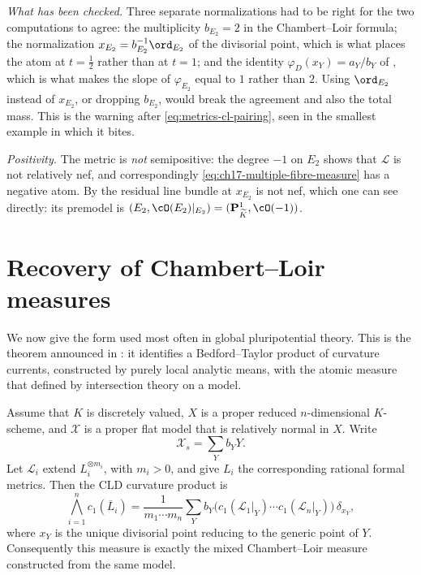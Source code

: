 \begin{example}
\emph{What has been checked.}  Three separate normalizations had to be right
for the two computations to agree: the multiplicity $b_{E_2}=2$ in the
Chambert--Loir formula; the normalization
$x_{E_2}=b_{E_2}^{-1}\ord_{E_2}$ of the divisorial point, which is what
places the atom at $t=\tfrac12$ rather than at $t=1$; and the identity
$\varphi_D(x_Y)=a_Y/b_Y$ of
, which is what makes the slope of
$\varphi_{E_2}$ equal to $1$ rather than $2$.  Using $\ord_{E_2}$
instead of $x_{E_2}$, or dropping $b_{E_2}$, would break the agreement
and also the total mass.  This is the warning after
\eqref{eq:metrics-cl-pairing}, seen in the smallest example in which it
bites.

\emph{Positivity.}  The metric is \emph{not} semipositive: the degree
$-1$ on $E_2$ shows that $\mathcal L$ is not relatively nef, and
correspondingly \eqref{eq:ch17-multiple-fibre-measure} has a negative atom.
By  the residual line bundle at
$x_{E_2}$ is not nef, which one can see directly: its premodel is
$(E_2,\cO(E_2)|_{E_2})=(\mathbf P^1_{\widetilde K},\cO(-1))$.
\end{example}

\section{Recovery of Chambert--Loir measures}
\label{sec:ch17-cl}

We now give the form used most often in global pluripotential theory.  This
is the theorem announced in : it identifies a
Bedford--Taylor product of curvature currents, constructed by purely local
analytic means, with the atomic measure that  defined by
intersection theory on a model.

\begin{theorem}
\label{thm:cld-recovers-cl}
Assume that $K$ is discretely valued, $X$ is a proper reduced
$n$-dimensional $K$-scheme, and $\mathcal X$ is a proper flat model
that is relatively normal in $X$.  Write
\[
                         \mathcal X_s=\sum_Y b_Y Y.
\]
Let $\mathcal L_i$ extend $L_i^{\otimes m_i}$, with $m_i>0$, and
give $L_i$ the corresponding rational formal metrics.  Then the CLD
curvature product is
\begin{equation}
 \bigwedge_{i=1}^n c_1(\overline L_i)
   =\frac{1}{m_1\cdots m_n}
     \sum_Y b_Y
       \bigl(c_1(\mathcal L_1|_Y)\cdots
             c_1(\mathcal L_n|_Y)\bigr)\,\delta_{x_Y},
\label{eq:cld-chambert-loir-formula}
\end{equation}
where $x_Y$ is the unique divisorial point reducing to the generic point
of $Y$.  Consequently this measure is exactly the mixed
Chambert--Loir measure constructed from the same model.
\end{theorem}

